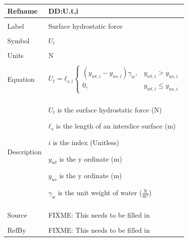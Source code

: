 \documentclass[12pt]{article}
\begin{document}
\noindent \begin{minipage}{\textwidth}
\begin{tabular}{p{} p{}}
\toprule \textbf{Refname} & \textbf{DD:U.t,i}
\label{DD:U.t,i}
\\ \midrule \\
Label & Surface hydrostatic force
\\ \midrule \\
Symbol & ${U_{t}}$
\\ \midrule \\
Units & N
\\ \midrule \\
Equation & \begin{dmath}
           {U_{t}}={ℓ_{s,i}} \begin{cases}
\left({y_{wt,i}}-{y_{us,i}}\right) {γ_{w}}, & {y_{wt,i}}>{y_{us,i}}\\
0, & {y_{wt,i}}\leq{}{y_{us,i}}
\end{cases}
           \end{dmath}
\\ \midrule \\
Description & \begin{symbDescription}
              \item{${U_{t}}$ is the surface hydrostatic force (N)}
              \item{${ℓ_{s}}$ is the length of an interslice surface (m)}
              \item{$i$ is the index (Unitless)}
              \item{${y_{wt}}$ is the y ordinate (m)}
              \item{${y_{us}}$ is the y ordinate (m)}
              \item{${γ_{w}}$ is the unit weight of water ($\frac{\text{N}}{\text{m}^{3}}$)}
              \end{symbDescription}
\\ \midrule \\
Source & FIXME: This needs to be filled in
\\ \midrule \\
RefBy & FIXME: This needs to be filled in
\\ \bottomrule \end{tabular}
\end{minipage}\\
~\newline
\end{document}
